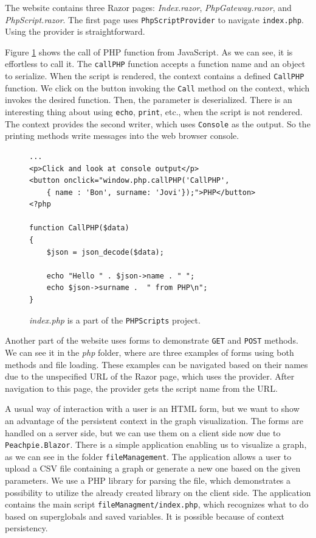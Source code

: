 The website contains three Razor pages: \textit{Index.razor}, \textit{PhpGateway.razor}, and \textit{PhpScript.razor}.
The first page uses \texttt{PhpScriptProvider} to navigate \texttt{index.php}.
Using the provider is straightforward.
\par
Figure \ref{img26:index} shows the call of PHP function from JavaScript.
As we can see, it is effortless to call it.
The \texttt{callPHP} function accepts a function name and an object to serialize.
When the script is rendered, the context contains a defined \texttt{CallPHP} function.
We click on the button invoking the \texttt{Call} method on the context, which invokes the desired function.
Then, the parameter is deserialized.
There is an interesting thing about using \texttt{echo}, \texttt{print}, etc., when the script is not rendered.
The context provides the second writer, which uses \texttt{Console} as the output.
So the printing methods write messages into the web browser console.
\begin{figure}
\begin{lstlisting}
...
<p>Click and look at console output</p>
<button onclick="window.php.callPHP('CallPHP',
	{ name : 'Bon', surname: 'Jovi'});">PHP</button>
<?php

function CallPHP($data)
{
    $json = json_decode($data); 

	echo "Hello " . $json->name . " ";
	echo $json->surname .  " from PHP\n";
}
\end{lstlisting}
\caption{\textit{index.php} is a part of the \texttt{PHPScripts} project.}
\label{img26:index}
\end{figure}
\par
Another part of the website uses forms to demonstrate \texttt{GET} and \texttt{POST} methods.
We can see it in the \textit{php} folder, where are three examples of forms using both methods and file loading.
These examples can be navigated based on their names due to the unspecified URL of the Razor page, which uses the provider.
After navigation to this page, the provider gets the script name from the URL.
\par
A usual way of interaction with a user is an HTML form, but we want to show an advantage of the persistent context in the graph visualization.
The forms are handled on a server side, but we can use them on a client side now due to \texttt{Peachpie.Blazor}.
There is a simple application enabling us to visualize a graph, as we can see in the folder \texttt{fileManagement}.
The application allows a user to upload a CSV file containing a graph or generate a new one based on the given parameters.
We use a PHP library for parsing the file, which demonstrates a possibility to utilize the already created library on the client side.
The application contains the main script \texttt{fileManagment/index.php}, which recognizes what to do based on superglobals and saved variables.
It is possible because of context persistency.

